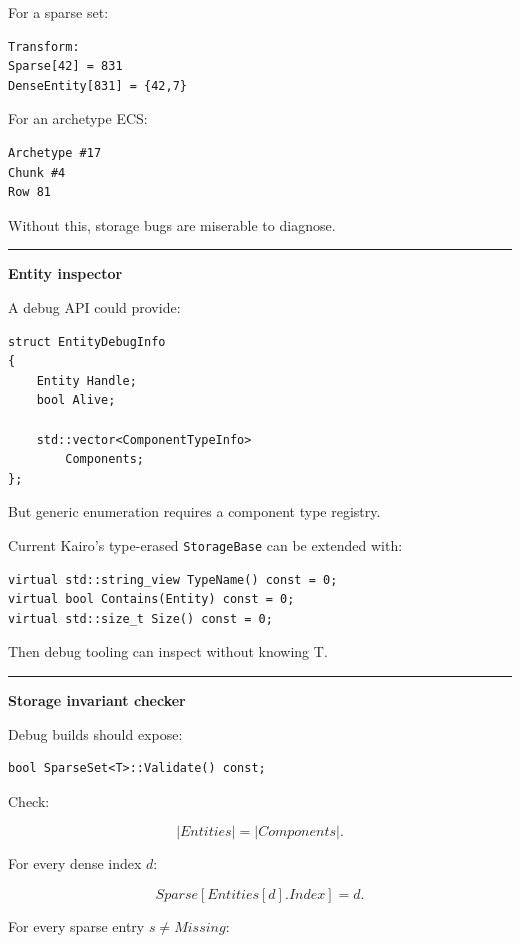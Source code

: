 For a sparse set:

\begin{verbatim}
Transform:
Sparse[42] = 831
DenseEntity[831] = {42,7}
\end{verbatim}

For an archetype ECS:

\begin{verbatim}
Archetype #17
Chunk #4
Row 81
\end{verbatim}

Without this, storage bugs are miserable to diagnose.

\begin{center}\rule{0.5\linewidth}{0.5pt}\end{center}

\textbf{Entity inspector}

A debug API could provide:

\begin{verbatim}
struct EntityDebugInfo
{
    Entity Handle;
    bool Alive;

    std::vector<ComponentTypeInfo>
        Components;
};
\end{verbatim}

But generic enumeration requires a component type registry.

Current Kairo's type-erased \texttt{StorageBase} can be extended with:

\begin{verbatim}
virtual std::string_view TypeName() const = 0;
virtual bool Contains(Entity) const = 0;
virtual std::size_t Size() const = 0;
\end{verbatim}

Then debug tooling can inspect without knowing T.

\begin{center}\rule{0.5\linewidth}{0.5pt}\end{center}

\textbf{Storage invariant checker}

Debug builds should expose:

\begin{verbatim}
bool SparseSet<T>::Validate() const;
\end{verbatim}

Check:

\[
|Entities|=|Components|.
\]

For every dense index \(d\):

\[
Sparse[Entities[d].Index]=d.
\]

For every sparse entry \(s\neq Missing\):

